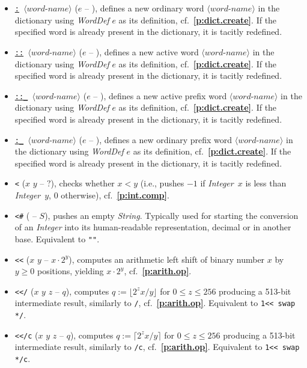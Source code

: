 \documentclass[12pt,oneside]{article}
\def\refpoint#1{{\rm\textbf{\ref{#1}}}}
\let\ptref=\refpoint
\begin{document}
\begin{itemize}
\item {\tt \underline{:} $\langle\textit{word-name}\rangle$} ($e$ -- ), defines a new ordinary word $\langle\textit{word-name}\rangle$ in the dictionary using {\em WordDef\/} $e$ as its definition, cf.~\ptref{p:dict.create}. If the specified word is already present in the dictionary, it is tacitly redefined.
\item {\tt \underline{::} $\langle\textit{word-name}\rangle$} ($e$ -- ), defines a new active word $\langle\textit{word-name}\rangle$ in the dictionary using {\em WordDef\/} $e$ as its definition, cf.~\ptref{p:dict.create}. If the specified word is already present in the dictionary, it is tacitly redefined.
\item {\tt \underline{::\_} $\langle\textit{word-name}\rangle$} ($e$ -- ), defines a new active prefix word $\langle\textit{word-name}\rangle$ in the dictionary using {\em WordDef\/} $e$ as its definition, cf.~\ptref{p:dict.create}. If the specified word is already present in the dictionary, it is tacitly redefined.
\item {\tt \underline{:\_} $\langle\textit{word-name}\rangle$} ($e$ -- ), defines a new ordinary prefix word $\langle\textit{word-name}\rangle$ in the dictionary using {\em WordDef\/} $e$ as its definition, cf.~\ptref{p:dict.create}. If the specified word is already present in the dictionary, it is tacitly redefined.
\item {\tt <} ($x$ $y$ -- $?$), checks whether $x<y$ (i.e., pushes $-1$ if {\em Integer\/}~$x$ is less than {\em Integer\/}~$y$, $0$ otherwise), cf.~\ptref{p:int.comp}.
\item {\tt <\#} ( -- $S$), pushes an empty {\em String}. Typically used for starting the conversion of an {\em Integer\/} into its human-readable representation, decimal or in another base. Equivalent to {\tt ""}.
\item {\tt <{}<} ($x$ $y$ -- $x\cdot 2^y$), computes an arithmetic left shift of binary number $x$ by $y\geq0$ positions, yielding $x\cdot 2^y$, cf.~\ptref{p:arith.op}.
\item {\tt <{}</} ($x$ $y$ $z$ -- $q$), computes $q:=\lfloor 2^zx/y\rfloor$ for $0\leq z\leq 256$ producing a 513-bit intermediate result, similarly to {\tt */}, cf.~\ptref{p:arith.op}. Equivalent to {\tt 1<{}< swap */}.
\item {\tt <{}</c} ($x$ $y$ $z$ -- $q$), computes $q:=\lceil 2^zx/y\rceil$ for $0\leq z\leq 256$ producing a 513-bit intermediate result, similarly to {\tt */c}, cf.~\ptref{p:arith.op}. Equivalent to {\tt 1<{}< swap */c}.

\end{itemize}
\end{document}
